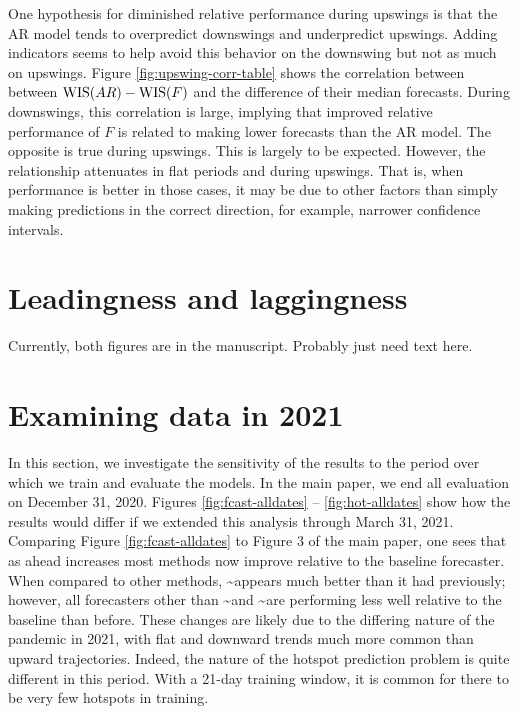 \documentclass[9pt,twoside,lineno]{pnas-new}
\begin{document}
One hypothesis for diminished relative performance during upswings is
that the AR model tends to overpredict downswings and underpredict
upswings. Adding indicators seems to help avoid this behavior on the
downswing but not as much on upswings. Figure
\ref{fig:upswing-corr-table} shows the correlation between between
\(\mathrm{WIS}(AR) - \mathrm{WIS}(F)\) and the difference of their median forecasts.
During downswings, this correlation is large, implying that improved
relative performance of \(F\) is related to making lower forecasts than
the AR model. The opposite is true during upswings. This is largely to
be expected. However, the relationship attenuates in flat periods and
during upswings. That is, when performance is better in those cases, it
may be due to other factors than simply making predictions in the
correct direction, for example, narrower confidence intervals.

\hypertarget{leadingness-and-laggingness}{%
\section{Leadingness and
laggingness}\label{leadingness-and-laggingness}}

Currently, both figures are in the manuscript. Probably just need text
here.

\hypertarget{examining-data-in-2021}{%
\section{Examining data in 2021}\label{examining-data-in-2021}}

In this section, we investigate the sensitivity of the results to the
period over which we train and evaluate the models. In the main paper,
we end all evaluation on December 31, 2020. Figures
\ref{fig:fcast-alldates} -- \ref{fig:hot-alldates} show how the results
would differ if we extended this analysis through March 31, 2021.
Comparing Figure \ref{fig:fcast-alldates} to Figure 3 of the main paper,
one sees that as ahead increases most methods now improve relative to
the baseline forecaster. When compared to other methods,
\chngcli\textasciitilde appears much better than it had previously;
however, all forecasters other than \chngcov\textasciitilde and
\dv\textasciitilde are performing less well relative to the baseline
than before. These changes are likely due to the differing nature of the
pandemic in 2021, with flat and downward trends much more common than
upward trajectories. Indeed, the nature of the hotspot prediction
problem is quite different in this period. With a 21-day training
window, it is common for there to be very few hotspots in training.
\end{document}
